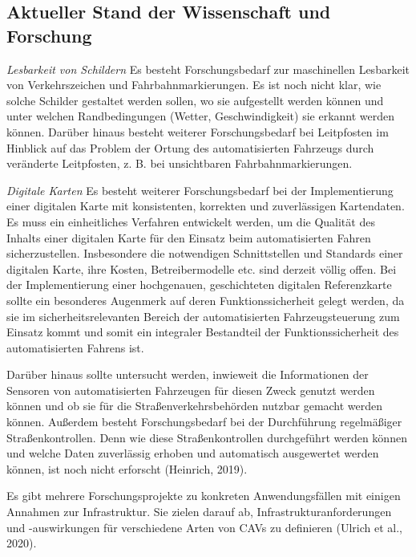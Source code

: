 \documentclass[
]{book}
\begin{document}
\hypertarget{aktueller-stand-der-wissenschaft-und-forschung-19}{%
\subsection*{Aktueller Stand der Wissenschaft und Forschung}\label{aktueller-stand-der-wissenschaft-und-forschung-19}}

\emph{Lesbarkeit von Schildern}
Es besteht Forschungsbedarf zur maschinellen Lesbarkeit von Verkehrszeichen und Fahrbahnmarkierungen. Es ist noch nicht klar, wie solche Schilder gestaltet werden sollen, wo sie aufgestellt werden können und unter welchen Randbedingungen (Wetter, Geschwindigkeit) sie erkannt werden können. Darüber hinaus besteht weiterer Forschungsbedarf bei Leitpfosten im Hinblick auf das Problem der Ortung des automatisierten Fahrzeugs durch veränderte Leitpfosten, z. B. bei unsichtbaren Fahrbahnmarkierungen.

\emph{Digitale Karten}
Es besteht weiterer Forschungsbedarf bei der Implementierung einer digitalen Karte mit konsistenten, korrekten und zuverlässigen Kartendaten. Es muss ein einheitliches Verfahren entwickelt werden, um die Qualität des Inhalts einer digitalen Karte für den Einsatz beim automatisierten Fahren sicherzustellen. Insbesondere die notwendigen Schnittstellen und Standards einer digitalen Karte, ihre Kosten, Betreibermodelle etc. sind derzeit völlig offen. Bei der Implementierung einer hochgenauen, geschichteten digitalen Referenzkarte sollte ein besonderes Augenmerk auf deren Funktionssicherheit gelegt werden, da sie im sicherheitsrelevanten Bereich der automatisierten Fahrzeugsteuerung zum Einsatz kommt und somit ein integraler Bestandteil der Funktionssicherheit des automatisierten Fahrens ist.

Darüber hinaus sollte untersucht werden, inwieweit die Informationen der Sensoren von automatisierten Fahrzeugen für diesen Zweck genutzt werden können und ob sie für die Straßenverkehrsbehörden nutzbar gemacht werden können. Außerdem besteht Forschungsbedarf bei der Durchführung regelmäßiger Straßenkontrollen. Denn wie diese Straßenkontrollen durchgeführt werden können und welche Daten zuverlässig erhoben und automatisch ausgewertet werden können, ist noch nicht erforscht (Heinrich, 2019).

Es gibt mehrere Forschungsprojekte zu konkreten Anwendungsfällen mit einigen Annahmen zur Infrastruktur. Sie zielen darauf ab, Infrastrukturanforderungen und -auswirkungen für verschiedene Arten von CAVs zu definieren (Ulrich et al., 2020).
\end{document}
